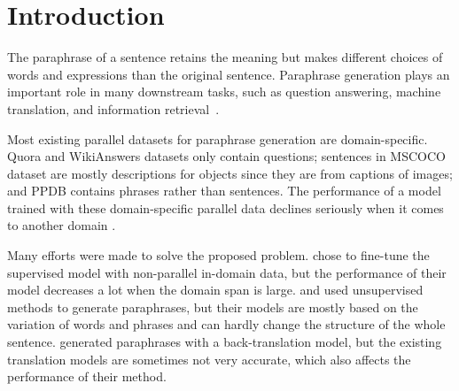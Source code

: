 \section{Introduction}
The paraphrase of a sentence retains the meaning but makes different choices
of words and expressions than the original sentence. 
Paraphrase generation plays an important role in many downstream tasks, 
such as question answering, machine translation, and information 
retrieval~\citep{hu2019improved}. 

Most existing parallel datasets for paraphrase generation are 
domain-specific. Quora and WikiAnswers \citep{fader2013paraphrase} datasets 
only contain questions; sentences in MSCOCO \citep{lin2014microsoft} dataset 
are mostly descriptions for objects since they are from captions of images; 
and PPDB \citep{ganitkevitch2013ppdb} contains phrases rather than sentences. 
The performance of a model trained with these domain-specific parallel data declines seriously when it comes to 
another domain \citep{li2019decomposable}. 

Many efforts were made to solve the proposed problem.
\citet{li2019decomposable} chose to fine-tune the supervised model with non-parallel in-domain data, but the performance of their model decreases a lot when the domain span is large.
\citet{liu2019unsupervised} and \citet{miao2019cgmh} used unsupervised methods to generate paraphrases, but their models are mostly based on the variation of 
words and phrases and can hardly change the structure of the whole sentence. 
\citet{wieting2017paranmt} generated paraphrases with a back-translation model, but the existing translation models are sometimes not very accurate, which also affects the performance of their method.

% 

